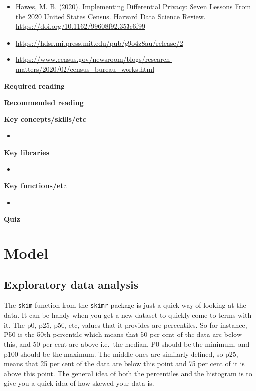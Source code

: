 \documentclass[
]{book}
\begin{document}
\begin{itemize}
\item
  Hawes, M. B. (2020). Implementing Differential Privacy: Seven Lessons From the 2020 United States Census. Harvard Data Science Review. \url{https://doi.org/10.1162/99608f92.353c6f99}
\item
  \url{https://hdsr.mitpress.mit.edu/pub/g9o4z8au/release/2}
\item
  \url{https://www.census.gov/newsroom/blogs/research-matters/2020/02/census_bureau_works.html}
\end{itemize}

\textbf{Required reading}

\textbf{Recommended reading}

\textbf{Key concepts/skills/etc}

\begin{itemize}
\item
\end{itemize}

\textbf{Key libraries}

\begin{itemize}
\item
\end{itemize}

\textbf{Key functions/etc}

\begin{itemize}
\item
\end{itemize}

\textbf{Quiz}

\hypertarget{part-model}{%
\part{Model}\label{part-model}}

\hypertarget{exploratory-data-analysis}{%
\chapter{Exploratory data analysis}\label{exploratory-data-analysis}}

The \texttt{skim} function from the \texttt{skimr} package is just a quick way of looking at the data. It can be handy when you get a new dataset to quickly come to terms with it. The p0, p25, p50, etc, values that it provides are percentiles. So for instance, P50 is the 50th percentile which means that 50 per cent of the data are below this, and 50 per cent are above i.e.~the median. P0 should be the minimum, and p100 should be the maximum. The middle ones are similarly defined, so p25, means that 25 per cent of the data are below this point and 75 per cent of it is above this point. The general idea of both the percentiles and the histogram is to give you a quick idea of how skewed your data is.
\end{document}
